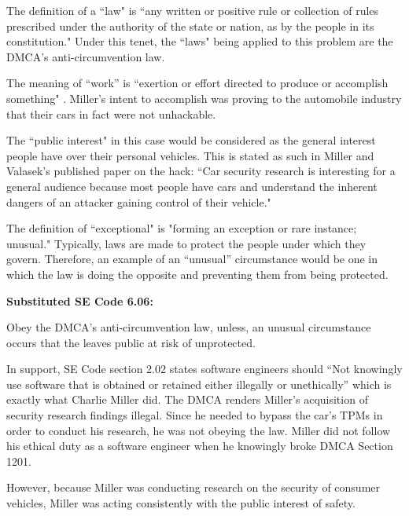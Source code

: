 \documentclass[12pt]{article}
\begin{document}
\begin{multicols}{2}
The definition of a ``law" is ``any written or positive rule or collection of rules prescribed under the authority of the state or nation, as by the people in its constitution."\cite{dictionary} Under this tenet, the ``laws" being applied to this problem are the DMCA's anti-circumvention law. 





The meaning of ``work'' is ``exertion or effort directed to produce or accomplish something" \cite{dictionary}. Miller's intent to accomplish was proving to the automobile industry that their cars in fact were not unhackable. \cite{youtube}

The ``public interest" in this case would be considered as the general interest people have over their personal vehicles. This is stated as such in Miller and Valasek's published paper on the hack: ``Car security research is interesting for a general audience because most people have cars and understand the inherent dangers of an attacker gaining control of their vehicle." \cite{officialPaper}

The definition of ``exceptional" is "forming an exception or rare instance; unusual." \cite{dictionary} Typically, laws are made to protect the people under which they govern. Therefore, an example of an ``unusual'' circumstance would be one in which the law is doing the opposite and preventing them from being protected.

\vspace{.5cm}\textbf{Substituted SE Code 6.06:}\vspace{.25cm}

Obey the DMCA's anti-circumvention law, unless, an unusual circumstance occurs that the leaves public at risk of unprotected.

In support, SE Code section 2.02 states software engineers should ``Not knowingly use software that is obtained or retained either illegally or unethically'' \cite{seCode} which is exactly what Charlie Miller did. The DMCA renders Miller's acquisition of security research findings illegal.  Since he needed to bypass the car's TPMs in order to conduct his research, he was not obeying the law. Miller did not follow his ethical duty as a software engineer when he knowingly broke DMCA Section 1201.

However, because Miller was conducting research on the security of consumer vehicles, Miller was acting consistently with the public interest of safety.





\end{multicols}
\end{document}
